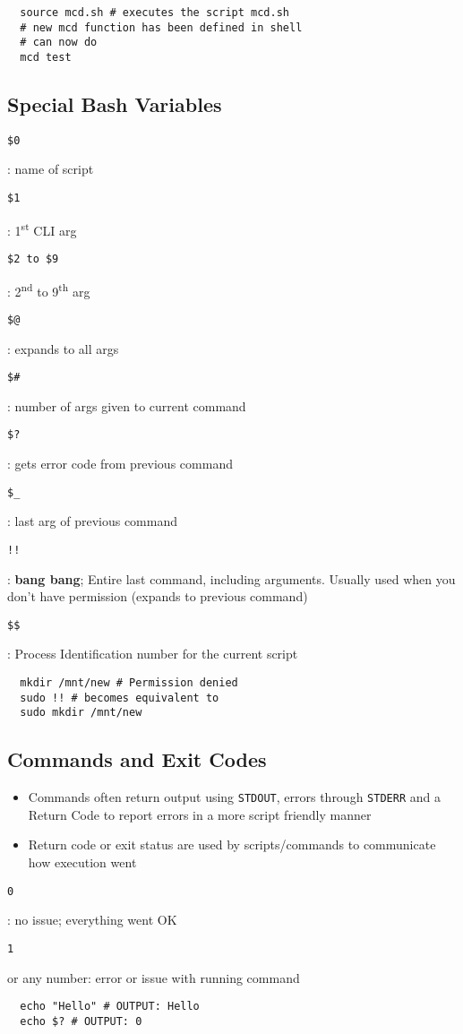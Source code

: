\documentclass[letterpaper,12pt]{article}
\newcommand*{\lstitem}[1]{
  \setbox0\hbox{\lstinline{#1}}
  \item[\usebox0]
}
\begin{document}
\begin{lstlisting}
  source mcd.sh # executes the script mcd.sh
  # new mcd function has been defined in shell
  # can now do
  mcd test
\end{lstlisting}

\subsection{Special Bash Variables}
\begin{description}
 \lstitem{$0}: name of script
 \lstitem{$1}: 1\textsuperscript{st} CLI arg
 \lstitem{$2 to $9}: 2\textsuperscript{nd} to 9\textsuperscript{th} arg
 \lstitem{$@}: expands to all args
 \lstitem{$#}: number of args given to current command
 \lstitem{$?}: gets error code from previous command
 \lstitem{$_}: last arg of previous command
 \lstitem{!!}: \textbf{bang bang}; Entire last command, including arguments. Usually used when you don't have permission (expands to previous command)
 \lstitem{$$}: Process Identification number for the current script
\end{description}

\begin{lstlisting}
  mkdir /mnt/new # Permission denied
  sudo !! # becomes equivalent to
  sudo mkdir /mnt/new
\end{lstlisting}

\subsection{Commands and Exit Codes}

\begin{itemize}
 \item Commands often return output using \lstinline{STDOUT}, errors through \lstinline{STDERR} and a Return Code to report errors in a more script friendly manner
 \item Return code or exit status are used by scripts/commands to communicate how execution went
\end{itemize}

\begin{description}
 \lstitem{0}: no issue; everything went OK
 \lstitem{1} or any number: error or issue with running command
\end{description}

\begin{lstlisting}
  echo "Hello" # OUTPUT: Hello
  echo $? # OUTPUT: 0
\end{lstlisting}
\end{document}
